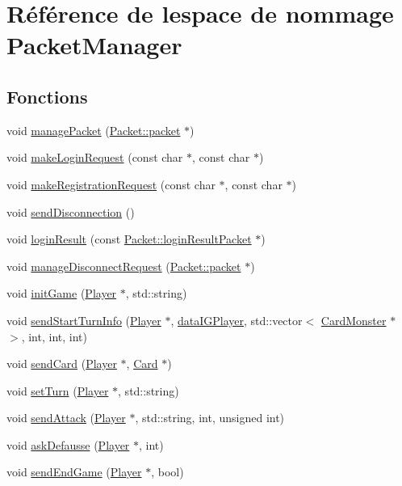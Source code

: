 \hypertarget{namespacePacketManager}{}\section{Référence de l\textquotesingle{}espace de nommage Packet\+Manager}
\label{namespacePacketManager}
\subsection*{Fonctions}
\begin{DoxyCompactItemize}
\item 
void \hyperlink{namespacePacketManager_ac206635e6603c3488fb11d04cc0fa3e9}{manage\+Packet} (\hyperlink{structPacket_1_1packet}{Packet\+::packet} $\ast$)
\item 
void \hyperlink{namespacePacketManager_a059f1572687e336c45e1cc73e069fe4f}{make\+Login\+Request} (const char $\ast$, const char $\ast$)
\item 
void \hyperlink{namespacePacketManager_adacf7794a085944d9bb34af27332605d}{make\+Registration\+Request} (const char $\ast$, const char $\ast$)
\item 
void \hyperlink{namespacePacketManager_a62456ed8f85eb40c84ec97b49f6fceff}{send\+Disconnection} ()
\item 
void \hyperlink{namespacePacketManager_a255a83fde064b3b6bbc192dc49ba30a4}{login\+Result} (const \hyperlink{structPacket_1_1loginResultPacket}{Packet\+::login\+Result\+Packet} $\ast$)
\item 
void \hyperlink{namespacePacketManager_a7f241c4d446ff9cf2a4e8a115a703786}{manage\+Disconnect\+Request} (\hyperlink{structPacket_1_1packet}{Packet\+::packet} $\ast$)
\item 
void \hyperlink{namespacePacketManager_ab8135c284f5e9b70cbc1c7e23817c6cc}{init\+Game} (\hyperlink{classPlayer}{Player} $\ast$, std\+::string)
\item 
void \hyperlink{namespacePacketManager_a078afb51e7bdcf7d3e85aaf809f0d127}{send\+Start\+Turn\+Info} (\hyperlink{classPlayer}{Player} $\ast$, \hyperlink{structdataIGPlayer}{data\+I\+G\+Player}, std\+::vector$<$ \hyperlink{classCardMonster}{Card\+Monster} $\ast$ $>$, int, int, int)
\item 
void \hyperlink{namespacePacketManager_a74fc2904645906581beacd89356bff8c}{send\+Card} (\hyperlink{classPlayer}{Player} $\ast$, \hyperlink{classCard}{Card} $\ast$)
\item 
void \hyperlink{namespacePacketManager_aeceb16b8b48bbcc11da40b68544b5d2a}{set\+Turn} (\hyperlink{classPlayer}{Player} $\ast$, std\+::string)
\item 
void \hyperlink{namespacePacketManager_ae2de5a6226f04bf18b076379e13a7669}{send\+Attack} (\hyperlink{classPlayer}{Player} $\ast$, std\+::string, int, unsigned int)
\item 
void \hyperlink{namespacePacketManager_ad09515d55f52f38ac6fc5ee056cc326f}{ask\+Defausse} (\hyperlink{classPlayer}{Player} $\ast$, int)
\item 
void \hyperlink{namespacePacketManager_ad984d73c69adb937d618f3b037ca50a7}{send\+End\+Game} (\hyperlink{classPlayer}{Player} $\ast$, bool)
\end{DoxyCompactItemize}


